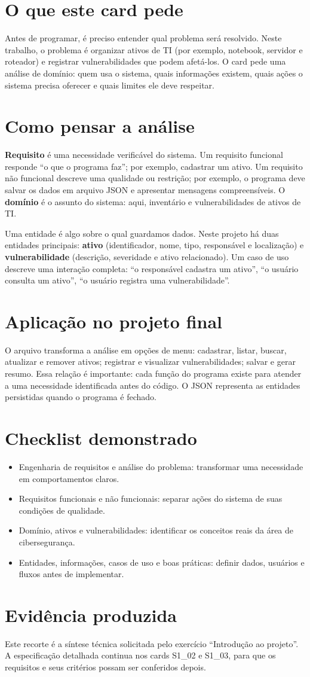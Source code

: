 \documentclass[11pt,a4paper]{article}
\begin{document}
\enlargethispage{3\baselineskip}
\section*{O que este card pede}
Antes de programar, é preciso entender qual problema será resolvido. Neste trabalho, o problema é organizar ativos de TI (por exemplo, notebook, servidor e roteador) e registrar vulnerabilidades que podem afetá-los. O card pede uma análise de domínio: quem usa o sistema, quais informações existem, quais ações o sistema precisa oferecer e quais limites ele deve respeitar.
\section*{Como pensar a análise}
\textbf{Requisito} é uma necessidade verificável do sistema. Um requisito funcional responde ``o que o programa faz''; por exemplo, cadastrar um ativo. Um requisito não funcional descreve uma qualidade ou restrição; por exemplo, o programa deve salvar os dados em arquivo JSON e apresentar mensagens compreensíveis. O \textbf{domínio} é o assunto do sistema: aqui, inventário e vulnerabilidades de ativos de TI.

Uma entidade é algo sobre o qual guardamos dados. Neste projeto há duas entidades principais: \textbf{ativo} (identificador, nome, tipo, responsável e localização) e \textbf{vulnerabilidade} (descrição, severidade e ativo relacionado). Um caso de uso descreve uma interação completa: ``o responsável cadastra um ativo'', ``o usuário consulta um ativo'', ``o usuário registra uma vulnerabilidade''.
\section*{Aplicação no projeto final}
O arquivo  transforma a análise em opções de menu: cadastrar, listar, buscar, atualizar e remover ativos; registrar e visualizar vulnerabilidades; salvar e gerar resumo. Essa relação é importante: cada função do programa existe para atender a uma necessidade identificada antes do código. O JSON representa as entidades persistidas quando o programa é fechado.
\section*{Checklist demonstrado}
\begin{itemize}
\item Engenharia de requisitos e análise do problema: transformar uma necessidade em comportamentos claros.
\item Requisitos funcionais e não funcionais: separar ações do sistema de suas condições de qualidade.
\item Domínio, ativos e vulnerabilidades: identificar os conceitos reais da área de cibersegurança.
\item Entidades, informações, casos de uso e boas práticas: definir dados, usuários e fluxos antes de implementar.
\end{itemize}
\section*{Evidência produzida}
Este recorte é a síntese técnica solicitada pelo exercício ``Introdução ao projeto''. A especificação detalhada continua nos cards S1\_02 e S1\_03, para que os requisitos e seus critérios possam ser conferidos depois.
\end{document}
